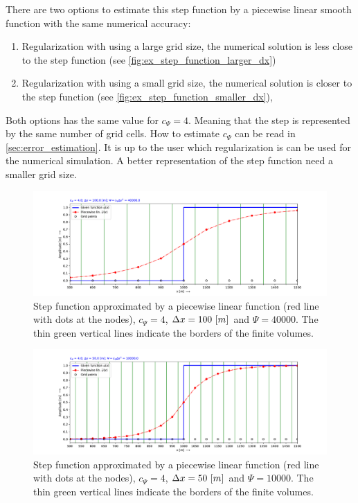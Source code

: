 There are two options to estimate this step function by a piecewise linear smooth function with the same numerical accuracy:
\begin{enumerate}
    \item Regularization with using a large grid size, the numerical solution is less close to the step function (see \autoref{fig:ex_step_function_larger_dx})
    \item Regularization with using a small grid size, the numerical solution is closer to the step function (see \autoref{fig:ex_step_function_smaller_dx}),
\end{enumerate}
Both options has the same value for $c_{\Psi} = 4$. Meaning that the step is represented by the same number of grid cells.
How to estimate $c_\Psi$ can be read in \autoref{sec:error_estimation}.
It is up to the user which regularization is can be used for the numerical simulation.
A better representation of the step function need a smaller grid size.
\begin{figure}[H]
    \centering
    \includegraphics[width=1.0\textwidth]{figures/regul_1d_step_function_dx100.0_cpsi4.0.pdf}
    \caption{Step function approximated by a piecewise linear function (red line with dots at the nodes), $c_{\Psi} = 4$, $\Delta x = 100\ [m]$ and $\Psi = 40000$. The thin green vertical lines indicate the  borders of the finite volumes. \label{fig:ex_step_function_larger_dx}}
\end{figure}
\begin{figure}[H]
    \centering
    \includegraphics[width=1.0\textwidth]{figures/regul_1d_step_function_dx50.0_cpsi4.0.pdf}
    \caption{Step function approximated by a piecewise linear function (red line with dots at the nodes), $c_{\Psi} = 4$, $\Delta x = 50\ [m]$ and $\Psi =10000$. The thin green vertical lines indicate the  borders of the finite volumes. \label{fig:ex_step_function_smaller_dx}}
\end{figure}
\vspace*{0.5\baselineskip}
%
